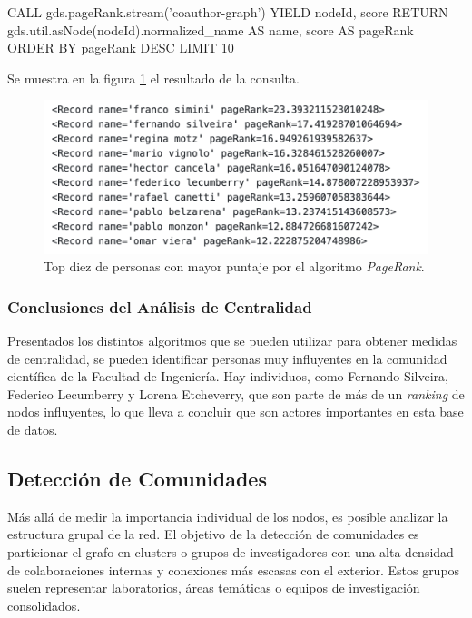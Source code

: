 \documentclass[journal]{IEEEtran}
\begin{document}
\begin{sflisting}[style=sparql,caption= PageRank,label=pagerank]
	CALL gds.pageRank.stream('coauthor-graph')
	YIELD nodeId, score
	RETURN gds.util.asNode(nodeId).normalized_name
	AS name, score AS pageRank
	ORDER BY pageRank DESC
	LIMIT 10
\end{sflisting}

Se muestra en la figura \ref{fig:page_rank} el resultado de la consulta.

\begin{figure}[b]
	\centering
	\includegraphics[width=\linewidth]{imagenes/pagerank.png}
	\caption{Top diez de personas con mayor puntaje por el algoritmo \textit{PageRank}.}
	\label{fig:page_rank}
\end{figure}


\subsubsection{Conclusiones del Análisis de Centralidad}
Presentados los distintos algoritmos que se pueden utilizar para obtener medidas de centralidad, se pueden identificar personas muy influyentes en la comunidad científica de la Facultad de Ingeniería. Hay individuos, como Fernando Silveira, Federico Lecumberry y Lorena Etcheverry, que son parte de más de un \textit{ranking} de nodos influyentes, lo que lleva a concluir que son actores importantes en esta base de datos.

\subsection{Detección de Comunidades}
Más allá de medir la importancia individual de los nodos, es posible analizar la estructura grupal de la red. El objetivo de la detección de comunidades es particionar el grafo en clusters o grupos de investigadores con una alta densidad de colaboraciones internas y conexiones más escasas con el exterior. Estos grupos suelen representar laboratorios, áreas temáticas o equipos de investigación consolidados.
\end{document}
